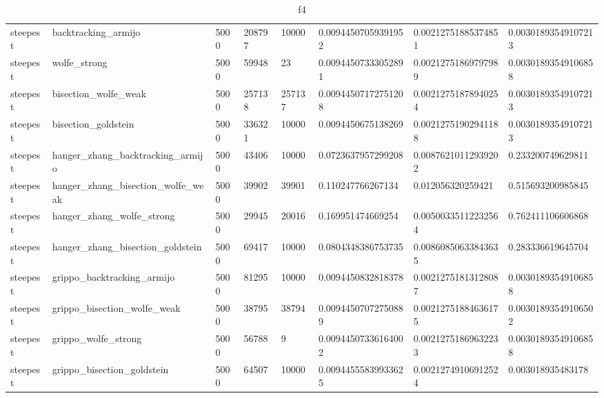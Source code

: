 \documentclass[a4paper,11pt]{article}
\numberwithin{equation}{section} %
\begin{document}
\begin{table}[h!]
{\begin{tabular}{|l|l|l|l|l|l|l|l|}
        steepest & backtracking\_armijo & 5000 & 208797 & 10000 & 0.00944507059391952 & 0.00212751885374851 & 0.00301893549107213 \\
        steepest & wolfe\_strong & 5000 & 59948 & 23 & 0.00944507333052891 & 0.00212751869797989 & 0.00301893549106858 \\
        steepest & bisection\_wolfe\_weak & 5000 & 257138 & 257137 & 0.00944507172751208 & 0.00212751878940254 & 0.00301893549107213 \\
        steepest & bisection\_goldstein & 5000 & 336321 & 10000 & 0.0094450675138269 & 0.00212751902941188 & 0.00301893549107213 \\
        steepest & hanger\_zhang\_backtracking\_armijo & 5000 & 43406 & 10000 & 0.0723637957299208 & 0.00876210112939202 & 0.233200749629811 \\
        steepest & hanger\_zhang\_bisection\_wolfe\_weak & 5000 & 39902 & 39901 & 0.110247766267134 & 0.012056320259421 & 0.515693200985845 \\
        steepest & hanger\_zhang\_wolfe\_strong & 5000 & 29945 & 20016 & 0.169951474669254 & 0.00500335112232564 & 0.762411106606868 \\
        steepest & hanger\_zhang\_bisection\_goldstein & 5000 & 69417 & 10000 & 0.0804348386753735 & 0.00860850633843635 & 0.283336619645704 \\
        steepest & grippo\_backtracking\_armijo & 5000 & 81295 & 10000 & 0.0094450832818378 & 0.00212751813128087 & 0.00301893549106858 \\
        steepest & grippo\_bisection\_wolfe\_weak & 5000 & 38795 & 38794 & 0.00944507072750889 & 0.00212751884636175 & 0.00301893549106502 \\
        steepest & grippo\_wolfe\_strong & 5000 & 56788 & 9 & 0.00944507336164002 & 0.00212751869632233 & 0.00301893549106858 \\
        steepest & grippo\_bisection\_goldstein & 5000 & 64507 & 10000 & 0.00944555839933625 & 0.00212749106912524 & 0.003018935483178 \\
\end{tabular}}
\caption{f4}
\label{table:f4}
\end{table}
\end{document}
